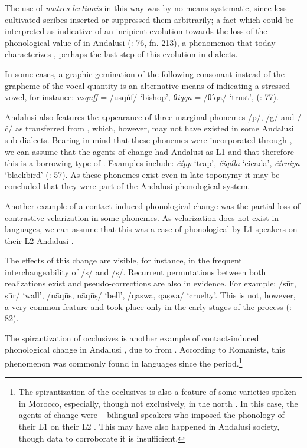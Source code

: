 \documentclass[output=paper,modfonts,nonflat]{langsci/langscibook}
\begin{document}
The use of \textit{matres} \textit{lectionis} in this way was by no means systematic, since {less cultivated scribes inserted or suppressed them arbitrarily}; a fact which could be interpreted as indicative of an incipient evolution towards the loss of the phonological value of  in Andalusi  (\citealt{CorrientePereiraVicente2015}: 76, fn. 213), a phenomenon that today characterizes  , perhaps the last step of this evolution in   dialects.

{In some cases, a graphic gemination of the following consonant instead of the grapheme of the vocal quantity is an alternative means of indicating a stressed vowel, for instance: {} \textit{usquff} = /usqúf/ ‘bishop’, {} \textit{θiqqa} = /θíqa/ ‘trust’,} {(\citealt{CorrientePereiraVicente2015}: 77)}{.} 

Andalusi  also features the appearance of three marginal phonemes /p/, /g/ and /č/ as transferred from , which, however, may not have existed in some Andalusi sub-dialects. Bearing in mind that these phonemes were incorporated through  \citep{Corriente1978}, we can assume that the agents of change had Andalusi  as L1 and that therefore this is a borrowing type of . Examples include: \textit{čípp} ‘trap’, \textit{čiqála} ‘cicada’, \textit{čírniya} ‘blackbird’ (\citealt{CorrientePereiraVicente2015}: 57). As these phonemes exist even in late toponymy it may be concluded that they were part of the Andalusi phonological system. 

Another example of a contact-induced phonological change was the partial loss of contrastive velarization in some phonemes. As velarization does not exist in  languages, we can assume that this was a case of phonological  by L1  speakers on their L2 Andalusi . 

The effects of this change are visible, for instance, in the frequent interchangeability of /s/ and /ṣ/. Recurrent permutations between both realizations exist and pseudo-corrections are also in evidence. For example: /sūr, ṣūr/ ‘wall’, /nāqūs, nāqūṣ/ ‘bell’, /qaswa, qaṣwa/ ‘cruelty’. This is not, however, a very common feature and took place only in the early stages of the  process (\citealt{CorrientePereiraVicente2015}: 82).\largerpage

The spirantization of occlusives is another example of contact-induced phonological change in Andalusi , due to  from . According to Romanists, this phenomenon was commonly found in  languages since the  period.\footnote{The spirantization of the occlusives is also a feature of some  varieties spoken in Morocco, especially, though not exclusively, in the north \citep[235--236]{SánchezVicente2012}. In this case, the agents of change were -- bilingual speakers who imposed the phonology of their L1  on their L2 . This may have also happened in Andalusi society, though data to corroborate it is insufficient.}
\end{document}
